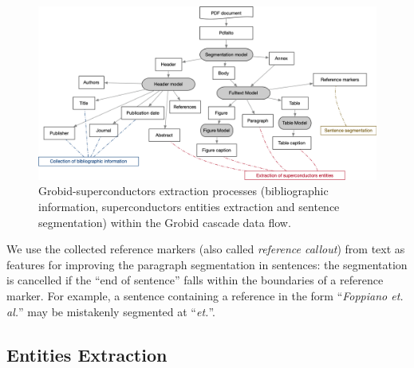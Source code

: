 \documentclass[]{interact}
\theoremstyle{plain}%
\theoremstyle{definition}
\theoremstyle{remark}
\begin{document}
\begin{figure}[ht]
\includegraphics[width=\textwidth]{grobid-extraction-2}
\caption{Grobid-superconductors extraction processes (bibliographic information, superconductors entities extraction and sentence segmentation) within the Grobid cascade data flow.}
\label{fig:grobid-document-processing}
\end{figure}

We use the collected reference markers (also called \textit{reference callout}) from text as features for improving the paragraph segmentation in sentences: the segmentation is cancelled if the ``end of sentence'' falls within the boundaries of a reference marker. 
For example, a sentence containing a reference in the form ``\textit{Foppiano et. al.}'' may be mistakenly segmented at ``\textit{et.}''.



\subsection{Entities Extraction}
\label{subsubsec:extraction}
\end{document}
